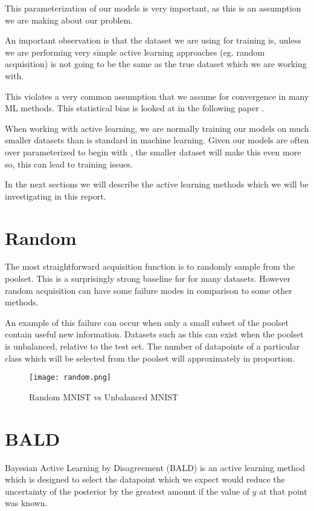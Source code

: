 \documentclass[12pt, a4paper]{report}
\theoremstyle{definition}
\theoremstyle{definition}
\theoremstyle{definition}
\begin{document}
This parameterization of our models is very important, as this is an assumption we are making about our problem.

An important observation is that the dataset we are using for training is, unless we are performing very simple active learning approaches (eg. random acquisition) is not going to be the same as the true dataset which we are working with.

This violates a very common assumption that we assume for convergence in many ML methods. This statistical bias is looked at in the following paper \cite{farquhar2021statistical}.

When working with active learning, we are normally training our models on much smaller datasets than is standard in machine learning. Given our models are often over parameterized to begin with \cite{}, the smaller dataset will make this even more so, this can lead to training issues.

In the next sections we will describe the active learning methods which we will be investigating in this report.

\section{Random}

The most straightforward acquisition function is to randomly sample from the poolset. This is a surprisingly strong baseline for for many datasets. However random acquisition can have some failure modes in comparison to some other methods. 

An example of this failure can occur when only a small subset of the poolset contain useful new information. Datasets such as this can exist when the poolset is unbalanced, relative to the test set. The number of datapoints of a particular class which will be selected from the poolset will approximately in proportion.

\begin{figure}[H]
    \centering
    \texttt{[image: random.png]}
    \caption{Random MNIST vs Unbalanced MNIST}
\end{figure}

\section{BALD}
Bayesian Active Learning by Disagreement (BALD) \cite{houlsby2011bayesian} is an active learning method which is designed to select the datapoint which we expect would reduce the uncertainty of the posterior by the greatest amount if the value of $y$ at that point was known.
\end{document}
